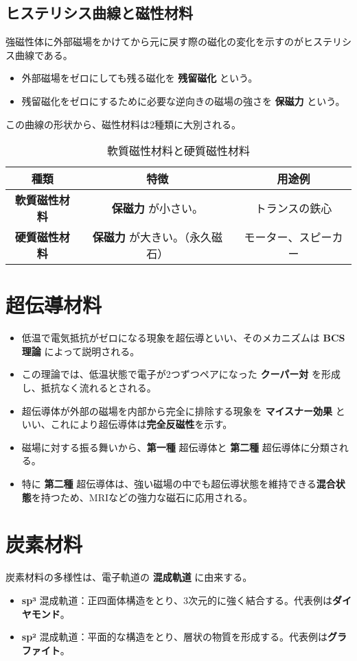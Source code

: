 \documentclass[11pt,a4paper]{ltjsarticle}
\newcommand{\ans}[1]{\textbf{#1}}
\begin{document}
\subsection{ヒステリシス曲線と磁性材料}
強磁性体に外部磁場をかけてから元に戻す際の磁化の変化を示すのがヒステリシス曲線である。
\begin{itemize}
    \item 外部磁場をゼロにしても残る磁化を \ans{残留磁化} という。
    \item 残留磁化をゼロにするために必要な逆向きの磁場の強さを \ans{保磁力} という。
\end{itemize}

この曲線の形状から、磁性材料は2種類に大別される。
\begin{table}[H]
    \centering
    \caption{軟質磁性材料と硬質磁性材料}
    \begin{tabular}{c|c|c}
        \toprule
        種類 & 特徴 & 用途例 \\
        \midrule
        \textbf{軟質磁性材料} & \ans{保磁力} が小さい。 & トランスの鉄心 \\
        \textbf{硬質磁性材料} & \ans{保磁力} が大きい。（永久磁石） & モーター、スピーカー \\
        \bottomrule
    \end{tabular}
\end{table}

\section{超伝導材料}
\begin{itemize}
    \item 低温で電気抵抗がゼロになる現象を超伝導といい、そのメカニズムは \ans{BCS理論} によって説明される。
    \item この理論では、低温状態で電子が2つずつペアになった \ans{クーパー対} を形成し、抵抗なく流れるとされる。
    \item 超伝導体が外部の磁場を内部から完全に排除する現象を \ans{マイスナー効果} といい、これにより超伝導体は\textbf{完全反磁性}を示す。
    \item 磁場に対する振る舞いから、\ans{第一種} 超伝導体と \ans{第二種} 超伝導体に分類される。
    \item 特に \ans{第二種} 超伝導体は、強い磁場の中でも超伝導状態を維持できる\textbf{混合状態}を持つため、MRIなどの強力な磁石に応用される。
\end{itemize}

\section{炭素材料}
炭素材料の多様性は、電子軌道の \ans{混成軌道} に由来する。
\begin{itemize}
    \item \ans{sp³} 混成軌道：正四面体構造をとり、3次元的に強く結合する。代表例は\textbf{ダイヤモンド}。
    \item \ans{sp²} 混成軌道：平面的な構造をとり、層状の物質を形成する。代表例は\textbf{グラファイト}。
\end{itemize}
\end{document}
